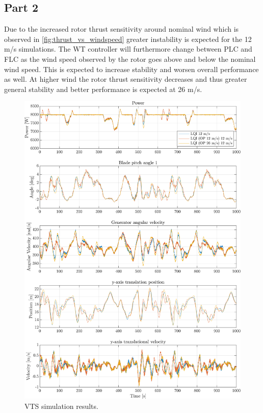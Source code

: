 \subsection{Part 2}


Due to the increased rotor thrust sensitivity around nominal wind which is observed in \cref{fig:thrust_vs_windspeed} greater instability is expected for the 12 m/s simulations. The WT controller will furthermore change between PLC and FLC as the wind speed observed by the rotor goes above and below the nominal wind speed. This is expected to increase stability and worsen overall performance as well. At higher wind the rotor thrust sensitivity decreases and thus greater general stability and better performance is expected at 26 m/s.


\begin{figure}[ht]
	\centering
	\includegraphics[width=0.7\linewidth]{Graphics/TestResults/VTSplotting/20_pow_th_w_py_vy.png}
	\caption{VTS simulation results.}
	\label{fig:vts_20_pow_th_w_py_vy}
\end{figure}


